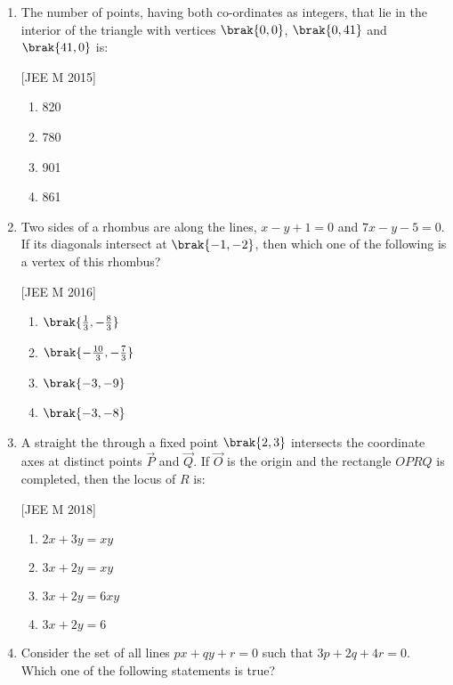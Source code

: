 \begin{enumerate}
\item The number of points, having both co-ordinates as integers, 
that lie in the interior of the triangle with vertices $\brak{0, 0}$,  $\brak{0,41}$ and $\brak{41, 0}$ is: 

\hfill{[JEE M 2015]}
\begin{multicols}{4}
\begin{enumerate}
\item 820
\item 780
\item 901
\item 861
\end{enumerate}
\end{multicols}

\item Two sides of a rhombus are along the lines, $x-y+1=0$ and 
$7x-y-5=0$. If its diagonals intersect at $\brak{-1, -2}$, then which one of the following is a vertex of this rhombus?

\hfill{[JEE M 2016]}
\begin{multicols}{2}
\begin{enumerate}
\item $\brak{\frac{1}{3}, -\frac{8}{3}}$
\item $\brak{-\frac{10}{3}, -\frac{7}{3}}$
\item $\brak{-3, -9}$
\item $\brak{-3, -8}$
\end{enumerate}
\end{multicols}

\item A straight the through a fixed point $\brak{2, 3}$ intersects the 
	coordinate axes at distinct points $\vec{P}$ and $\vec{Q}$. If $\vec{O}$ is the origin 
and the rectangle $OPRQ$ is completed, then the locus of $R$ is: 

\hfill{[JEE M 2018]}
\begin{multicols}{2}
\begin{enumerate}
\item $2x+3y = xy$
\item $3x+2y = xy$ 
\item $3x+2y = 6xy$ 
\item $3x+2y = 6$
\end{enumerate}
\end{multicols}

\item Consider the set of all lines $px+qy+r=0$ such that 
$3p+2q+4r=0$. Which one of the following statements is true? 


\end{enumerate}
